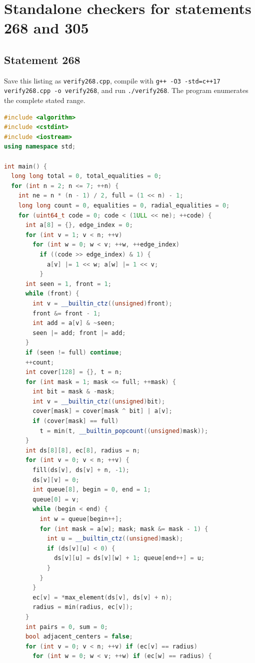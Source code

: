 \documentclass[11pt,a4paper]{article}
\theoremstyle{remark}
\begin{document}
\clearpage
\section{Standalone checkers for statements 268 and 305}\label{app:newtd}
\subsection{Statement 268}
Save this listing as \texttt{verify268.cpp}, compile with
\texttt{g++ -O3 -std=c++17 verify268.cpp -o verify268}, and run
\texttt{./verify268}. The program enumerates the complete stated range.
\begin{lstlisting}[language=C++]
#include <algorithm>
#include <cstdint>
#include <iostream>
using namespace std;

int main() {
  long long total = 0, total_equalities = 0;
  for (int n = 2; n <= 7; ++n) {
    int ne = n * (n - 1) / 2, full = (1 << n) - 1;
    long long count = 0, equalities = 0, radial_equalities = 0;
    for (uint64_t code = 0; code < (1ULL << ne); ++code) {
      int a[8] = {}, edge_index = 0;
      for (int v = 1; v < n; ++v)
        for (int w = 0; w < v; ++w, ++edge_index)
          if ((code >> edge_index) & 1) {
            a[v] |= 1 << w; a[w] |= 1 << v;
          }
      int seen = 1, front = 1;
      while (front) {
        int v = __builtin_ctz((unsigned)front);
        front &= front - 1;
        int add = a[v] & ~seen;
        seen |= add; front |= add;
      }
      if (seen != full) continue;
      ++count;
      int cover[128] = {}, t = n;
      for (int mask = 1; mask <= full; ++mask) {
        int bit = mask & -mask;
        int v = __builtin_ctz((unsigned)bit);
        cover[mask] = cover[mask ^ bit] | a[v];
        if (cover[mask] == full)
          t = min(t, __builtin_popcount((unsigned)mask));
      }
      int ds[8][8], ec[8], radius = n;
      for (int v = 0; v < n; ++v) {
        fill(ds[v], ds[v] + n, -1);
        ds[v][v] = 0;
        int queue[8], begin = 0, end = 1;
        queue[0] = v;
        while (begin < end) {
          int w = queue[begin++];
          for (int mask = a[w]; mask; mask &= mask - 1) {
            int u = __builtin_ctz((unsigned)mask);
            if (ds[v][u] < 0) {
              ds[v][u] = ds[v][w] + 1; queue[end++] = u;
            }
          }
        }
        ec[v] = *max_element(ds[v], ds[v] + n);
        radius = min(radius, ec[v]);
      }
      int pairs = 0, sum = 0;
      bool adjacent_centers = false;
      for (int v = 0; v < n; ++v) if (ec[v] == radius)
        for (int w = 0; w < v; ++w) if (ec[w] == radius) {

\end{lstlisting}
\end{document}
